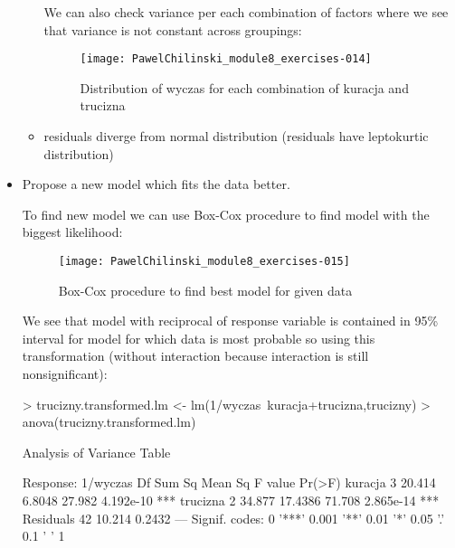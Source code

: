 \documentclass[a4paper]{article}
\begin{document}
\begin{itemize}
\begin{itemize}
    We can also check variance per each combination of factors where we see
    that variance is not constant across groupings:

\begin{figure}[H]
\begin{center}
\texttt{[image: PawelChilinski\_module8\_exercises-014]}
\caption{Distribution of wyczas for each combination of kuracja and trucizna}
\end{center}
\end{figure}
    
    
    \item residuals diverge from normal distribution (residuals have
    leptokurtic distribution)
  \end{itemize}

\item Propose a new model which fits the data better.

To find new model we can use Box-Cox procedure to find model with the biggest
likelihood: 
\begin{figure}[H]
\begin{center}
\texttt{[image: PawelChilinski\_module8\_exercises-015]}
\caption{Box-Cox procedure to find best model for given data}
\end{center}
\end{figure}

We see that model with reciprocal of response variable is contained in 95\%
interval for model for which data is most probable so using this transformation
(without interaction because interaction is still nonsignificant):
\begin{Schunk}
\begin{Sinput}
> trucizny.transformed.lm <- lm(1/wyczas~kuracja+trucizna,trucizny)	
> anova(trucizny.transformed.lm)
\end{Sinput}
\begin{Soutput}
Analysis of Variance Table

Response: 1/wyczas
          Df Sum Sq Mean Sq F value    Pr(>F)    
kuracja    3 20.414  6.8048  27.982 4.192e-10 ***
trucizna   2 34.877 17.4386  71.708 2.865e-14 ***
Residuals 42 10.214  0.2432                      
---
Signif. codes:  0 '***' 0.001 '**' 0.01 '*' 0.05 '.' 0.1 ' ' 1
\end{Soutput}
\end{Schunk}


\end{itemize}
\end{document}
